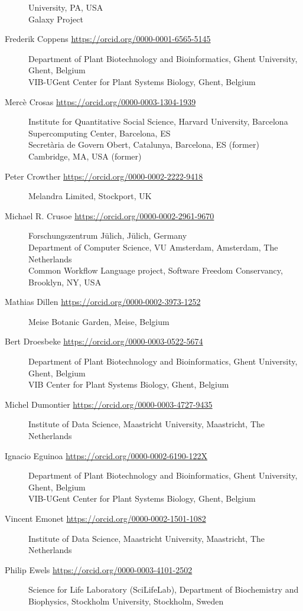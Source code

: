 \begin{description}
University, PA, USA\\
Galaxy Project
\item[Frederik Coppens \url{https://orcid.org/0000-0001-6565-5145}]
Department of Plant Biotechnology and Bioinformatics, Ghent University,
Ghent, Belgium\\
VIB-UGent Center for Plant Systems Biology, Ghent, Belgium
\item[Mercè Crosas \url{https://orcid.org/0000-0003-1304-1939}]
Institute for Quantitative Social Science, Harvard University,
Barcelona Supercomputing Center, Barcelona, ES\\
Secretària de Govern Obert, Catalunya, Barcelona, ES (former)
Cambridge, MA, USA (former)\\
\item[Peter Crowther \url{https://orcid.org/0000-0002-2222-9418}]
Melandra Limited, Stockport, UK
\item[Michael R. Crusoe \url{https://orcid.org/0000-0002-2961-9670}]
Forschungszentrum Jülich, Jülich, Germany\\
Department of Computer Science, VU Amsterdam, Amsterdam, The Netherlands\\
Common Workflow Language project, Software Freedom Conservancy,
Brooklyn, NY, USA
\item[Mathias Dillen \url{https://orcid.org/0000-0002-3973-1252}]
Meise Botanic Garden, Meise, Belgium
\item[Bert Droesbeke \url{https://orcid.org/0000-0003-0522-5674}]
Department of Plant Biotechnology and Bioinformatics, Ghent University,
Ghent, Belgium\\
VIB Center for Plant Systems Biology, Ghent, Belgium
\item[Michel Dumontier \url{https://orcid.org/0000-0003-4727-9435}]
Institute of Data Science, Maastricht University, Maastricht, The
Netherlands
\item[Ignacio Eguinoa \url{https://orcid.org/0000-0002-6190-122X}]
Department of Plant Biotechnology and Bioinformatics, Ghent University,
Ghent, Belgium\\
VIB-UGent Center for Plant Systems Biology, Ghent, Belgium
\item[Vincent Emonet \url{https://orcid.org/0000-0002-1501-1082}]
Institute of Data Science, Maastricht University, Maastricht, The
Netherlands
\item[Philip Ewels \url{https://orcid.org/0000-0003-4101-2502}]
Science for Life Laboratory (SciLifeLab), Department of Biochemistry and
Biophysics, Stockholm University, Stockholm, Sweden

\end{description}
